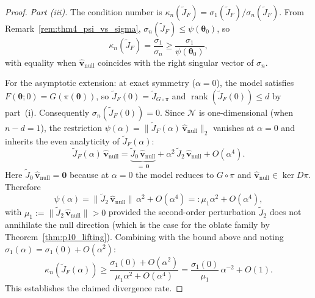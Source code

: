 \begin{proof}
\medskip
\noindent\textit{Part (iii).}\;
The condition number is
$\kappa_n(\widetilde{J}_F)=\sigma_1(\widetilde{J}_F)/\sigma_n(\widetilde{J}_F)$.
From Remark~\ref{rem:thm4_psi_vs_sigma},
$\sigma_n(\widetilde{J}_F)\leq\psi(\boldsymbol{\theta}_0)$, so
\begin{equation}
  \kappa_n(\widetilde{J}_F)
  =
  \frac{\sigma_1}{\sigma_n}
  \geq
  \frac{\sigma_1}{\psi(\boldsymbol{\theta}_0)},
\end{equation}
with equality when $\hat{\mathbf{v}}_\mathrm{null}$ coincides with the right
singular vector of $\sigma_n$.

For the asymptotic extension: at exact symmetry ($\alpha=0$), the model
satisfies $F(\boldsymbol{\theta};0)=G(\pi(\boldsymbol{\theta}))$, so
$\widetilde{J}_F(0)=\widetilde{J}_{G\circ\pi}$ and
$\operatorname{rank}(\widetilde{J}_F(0))\leq d$ by part~(i).  Consequently
$\sigma_n(\widetilde{J}_F(0))=0$.  Since $\mathcal{N}$ is one-dimensional
(when $n-d=1$), the restriction $\psi(\alpha)=\|\widetilde{J}_F(\alpha)\,
\hat{\mathbf{v}}_\mathrm{null}\|_2$ vanishes at $\alpha=0$ and inherits the
even analyticity of $\widetilde{J}_F(\alpha)$:
\begin{equation}
  \widetilde{J}_F(\alpha)\,\hat{\mathbf{v}}_\mathrm{null}
  =
  \underbrace{\widetilde{J}_0\,\hat{\mathbf{v}}_\mathrm{null}}_{=\,\mathbf{0}}
  + \alpha^2\,\widetilde{J}_2\,\hat{\mathbf{v}}_\mathrm{null}
  + O(\alpha^4).
\end{equation}
Here $\widetilde{J}_0\,\hat{\mathbf{v}}_\mathrm{null}=\mathbf{0}$ because at
$\alpha=0$ the model reduces to $G\circ\pi$ and
$\hat{\mathbf{v}}_\mathrm{null}\in\ker D\pi$.  Therefore
\begin{equation}
  \psi(\alpha)
  =
  \|\widetilde{J}_2\,\hat{\mathbf{v}}_\mathrm{null}\|\,\alpha^2 + O(\alpha^4)
  =:
  \mu_1\alpha^2 + O(\alpha^4),
\end{equation}
with $\mu_1:=\|\widetilde{J}_2\,\hat{\mathbf{v}}_\mathrm{null}\|>0$ provided
the second-order perturbation $\widetilde{J}_2$ does not annihilate the null
direction (which is the case for the oblate family by
Theorem~\ref{thm:p10_lifting}).  Combining with the bound above and noting
$\sigma_1(\alpha)=\sigma_1(0)+O(\alpha^2)$:
\begin{equation}
  \kappa_n(\widetilde{J}_F(\alpha))
  \geq
  \frac{\sigma_1(0)+O(\alpha^2)}{\mu_1\alpha^2+O(\alpha^4)}
  =
  \frac{\sigma_1(0)}{\mu_1}\,\alpha^{-2}+O(1).
\end{equation}
This establishes the claimed divergence rate.
\end{proof}

